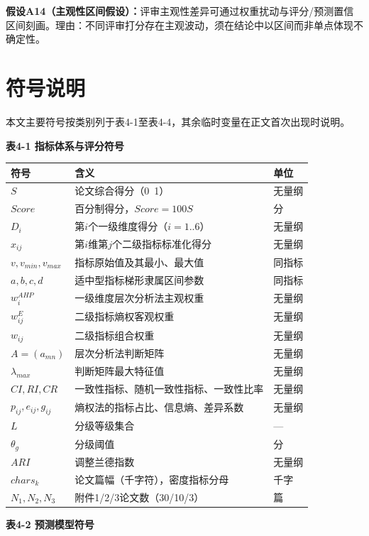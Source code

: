 \documentclass[withoutpreface]{cumcmthesis}
\begin{document}
\textbf{假设A14（主观性区间假设）：}评审主观性差异可通过权重扰动与评分/预测置信区间刻画。理由：不同评审打分存在主观波动，须在结论中以区间而非单点体现不确定性。

\section{符号说明}
本文主要符号按类别列于表4-1至表4-4，其余临时变量在正文首次出现时说明。

\textbf{表4-1 指标体系与评分符号}

\begin{table}[htbp]
\centering
\small
\begin{tabularx}{\textwidth}{XXX}
\toprule
符号 & 含义 & 单位 \\
\midrule
$S$ & 论文综合得分（0~1） & 无量纲 \\
$Score$ & 百分制得分，$Score=100S$ & 分 \\
$D_i$ & 第$i$个一级维度得分（$i=1..6$） & 无量纲 \\
$x_{ij}$ & 第$i$维第$j$个二级指标标准化得分 & 无量纲 \\
$v,v_{min},v_{max}$ & 指标原始值及其最小、最大值 & 同指标 \\
$a,b,c,d$ & 适中型指标梯形隶属区间参数 & 同指标 \\
$w_i^{AHP}$ & 一级维度层次分析法主观权重 & 无量纲 \\
$w_{ij}^{E}$ & 二级指标熵权客观权重 & 无量纲 \\
$w_{ij}$ & 二级指标组合权重 & 无量纲 \\
$A=(a_{mn})$ & 层次分析法判断矩阵 & 无量纲 \\
$\lambda_{max}$ & 判断矩阵最大特征值 & 无量纲 \\
$CI,RI,CR$ & 一致性指标、随机一致性指标、一致性比率 & 无量纲 \\
$p_{ij},e_{ij},g_{ij}$ & 熵权法的指标占比、信息熵、差异系数 & 无量纲 \\
$L$ & 分级等级集合 & — \\
$\theta_g$ & 分级阈值 & 分 \\
$ARI$ & 调整兰德指数 & 无量纲 \\
$chars_k$ & 论文篇幅（千字符），密度指标分母 & 千字 \\
$N_1,N_2,N_3$ & 附件1/2/3论文数（30/10/3） & 篇 \\
\bottomrule
\end{tabularx}
\end{table}
\textbf{表4-2 预测模型符号}
\end{document}
